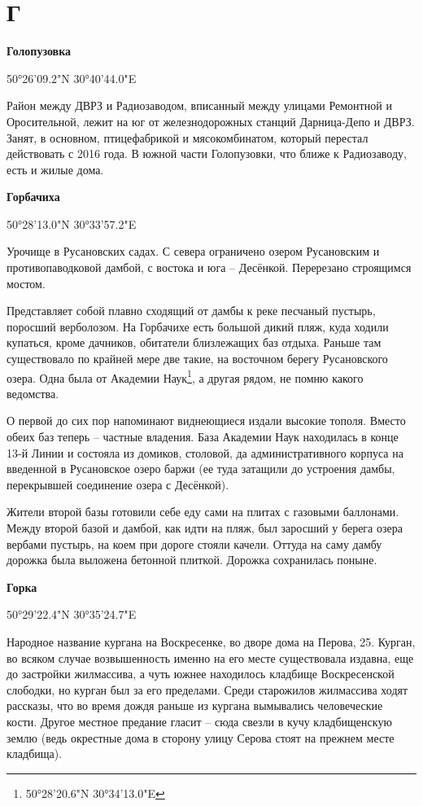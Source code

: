 \chapter*{Г}

\textbf{Голопузовка}

50°26'09.2"N 30°40'44.0"E

Район между ДВРЗ и Радиозаводом, вписанный между улицами Ремонтной и Оросительной, лежит на юг от железнодорожных станций Дарница-Депо и ДВРЗ. Занят, в основном, птицефабрикой и мясокомбинатом, который перестал действовать с 2016 года. В южной части Голопузовки, что ближе к Радиозаводу, есть и жилые дома.\\

\medskip

\textbf{Горбачиха}

50°28'13.0"N 30°33'57.2"E

Урочище в Русановских садах. С севера ограничено озером Русановским и противопаводковой дамбой, с востока и юга – Десёнкой. Перерезано строящимся мостом.

Представляет собой плавно сходящий от дамбы к реке песчаный пустырь, поросший верболозом. На Горбачихе есть большой дикий пляж, куда ходили  купаться, кроме дачников, обитатели близлежащих баз отдыха. Раньше там существовало по крайней мере две такие, на восточном берегу Русановского озера. Одна была от Академии Наук\footnote{50°28'20.6"N 30°34'13.0"E}, а другая рядом, не помню какого ведомства. 

О первой до сих пор напоминают виднеющиеся издали высокие тополя. Вместо обеих баз теперь – частные владения. База Академии Наук находилась в конце 13-й Линии и состояла из домиков, столовой, да административного корпуса на введенной в Русановское озеро баржи (ее туда затащили до устроения дамбы, перекрывшей соединение озера с Десёнкой).

Жители второй базы готовили себе еду сами на плитах с газовыми баллонами. Между второй базой и дамбой, как идти на пляж, был заросший у берега озера вербами пустырь, на коем при дороге стояли качели. Оттуда на саму дамбу дорожка была выложена бетонной плиткой. Дорожка сохранилась поныне.\\

\medskip

\textbf{Горка}

50°29'22.4"N 30°35'24.7"E

Народное название кургана на Воскресенке, во дворе дома на Перова, 25. Курган, во всяком случае возвышенность именно на его месте существовала издавна, еще до застройки жилмассива, а чуть южнее находилось кладбище Воскресенской слободки, но курган был за его пределами. Среди старожилов жилмассива ходят рассказы, что во время дождя раньше из кургана вымывались человеческие кости. Другое местное предание гласит – сюда свезли в кучу кладбищенскую землю (ведь окрестные дома в сторону улицу Серова стоят на прежнем месте кладбища).\\

